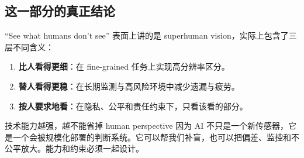 \subsection{这一部分的真正结论}

``See what humans don't see'' 表面上讲的是 superhuman vision，实际上包含了三层不同含义：

\begin{enumerate}
    \item \textbf{比人看得更细}：在 fine-grained 任务上实现高分辨率区分。
    \item \textbf{替人看得更稳}：在长期监测与高风险环境中减少遗漏与疲劳。
    \item \textbf{按人要求地看}：在隐私、公平和责任约束下，只看该看的部分。
\end{enumerate}

\begin{warningbox}{技术能力越强，越不能省掉 human perspective}
因为 AI 不只是一个新传感器，它是一个会被规模化部署的判断系统。它可以帮我们补盲，也可以把偏差、监控和不公平放大。能力和约束必须一起设计。
\end{warningbox}

